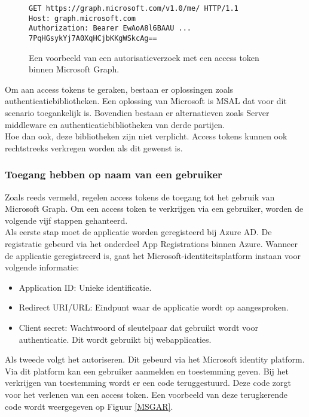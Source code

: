\begin{figure}[h]
    \scriptsize
    \begin{verbatim}
GET https://graph.microsoft.com/v1.0/me/ HTTP/1.1
Host: graph.microsoft.com
Authorization: Bearer EwAoA8l6BAAU ... 7PqHGsykYj7A0XqHCjbKKgWSkcAg==
    \end{verbatim}    
    \caption[Voorbeeld Microsoft Graph Autorisatieverzoek]{Een voorbeeld van een autorisatieverzoek met een access token binnen Microsoft Graph.}
    \label{MSGA}
\end{figure}

Om aan access tokens te geraken, bestaan er oplossingen zoals authenticatiebibliotheken. Een oplossing van Microsoft is \ac{MSAL} dat voor dit scenario toegankelijk is. Bovendien bestaan er alternatieven zoals Server middleware en authenticatiebibliotheken van derde partijen. \\

Hoe dan ook, deze bibliotheken zijn niet verplicht. Access tokens kunnen ook rechtstreeks verkregen worden als dit gewenst is. 

\subsubsection{Toegang hebben op naam van een gebruiker}

Zoals reeds vermeld, regelen access tokens de toegang tot het gebruik van Microsoft Graph. Om een access token te verkrijgen via een gebruiker, worden de volgende vijf stappen gehanteerd. \\

Als eerste stap moet de applicatie worden geregisteerd bij Azure \ac{AD}. De registratie gebeurd via het onderdeel App Registrations binnen Azure. Wanneer de applicatie geregistreerd is, gaat het Microsoft-identiteitsplatform instaan voor volgende informatie: 

\begin{itemize}
    \item Application ID: Unieke identificatie.
    \item Redirect URI/URL: Eindpunt waar de applicatie wordt op aangesproken.
    \item Client secret: Wachtwoord of sleutelpaar dat gebruikt wordt voor authenticatie. Dit wordt gebruikt bij webapplicaties.
\end{itemize}

Als tweede volgt het autoriseren. Dit gebeurd via het Microsoft identity platform. Via dit platform kan een gebruiker aanmelden en toestemming geven. Bij het verkrijgen van toestemming wordt er een code teruggestuurd. Deze code zorgt voor het verlenen van een access token. Een voorbeeld van deze terugkerende code wordt weergegeven op Figuur \ref{MSGAR}. \\

